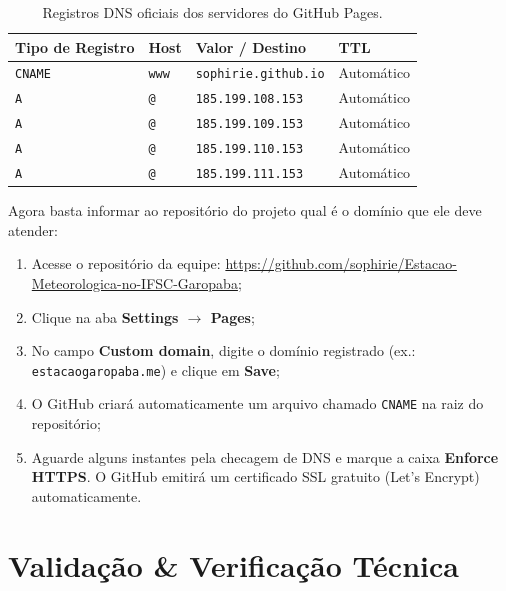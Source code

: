 \begin{table}[H]
\centering
\small
\begin{tabularx}{\textwidth}{l l X l}
\toprule
\textbf{Tipo de Registro} & \textbf{Host} & \textbf{Valor / Destino} & \textbf{TTL} \\
\midrule
\texttt{CNAME} & \texttt{www} & \texttt{sophirie.github.io} & Automático \\
\texttt{A} & \texttt{@} & \texttt{185.199.108.153} & Automático \\
\texttt{A} & \texttt{@} & \texttt{185.199.109.153} & Automático \\
\texttt{A} & \texttt{@} & \texttt{185.199.110.153} & Automático \\
\texttt{A} & \texttt{@} & \texttt{185.199.111.153} & Automático \\
\bottomrule
\end{tabularx}
\caption{Registros DNS oficiais dos servidores do GitHub Pages.}
\end{table}


Agora basta informar ao repositório do projeto qual é o domínio que ele deve atender:

\begin{enumerate}
  \item Acesse o repositório da equipe: \url{https://github.com/sophirie/Estacao-Meteorologica-no-IFSC-Garopaba};
  \item Clique na aba \textbf{Settings $\rightarrow$ Pages};
  \item No campo \textbf{Custom domain}, digite o domínio registrado (ex.: \texttt{estacaogaropaba.me}) e clique em \textbf{Save};
  \item O GitHub criará automaticamente um arquivo chamado \texttt{CNAME} na raiz do repositório;
  \item Aguarde alguns instantes pela checagem de DNS e marque a caixa \textbf{Enforce HTTPS}. O GitHub emitirá um certificado SSL gratuito (Let's Encrypt) automaticamente.
\end{enumerate}

\section{Validação \& Verificação Técnica}

